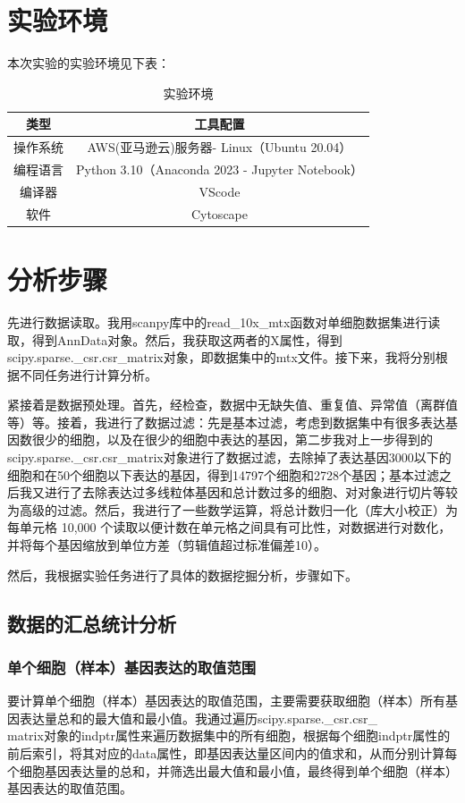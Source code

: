 \documentclass {article}
\begin{document}
%				
\section{实验环境}
本次实验的实验环境见下表：
	\begin{table}[H]
		\caption{实验环境}
		\centering
		\begin{tabular}{cc}
			\hline
			类型 & 工具配置 \\ \hline
			操作系统 & AWS(亚马逊云)服务器- Linux（Ubuntu 20.04）  \\
			编程语言 & Python 3.10（Anaconda 2023 - Jupyter Notebook） \\ 
			编译器  & VScode                                      \\ 
			软件   & Cytoscape                                     \\ \hline
		\end{tabular}
	\end{table}
		
\section{分析步骤}
	先进行数据读取。我用scanpy库中的read\_10x\_mtx函数对单细胞数据集进行读取，得到AnnData对象。然后，我获取这两者的X属性，得到scipy.sparse.\_csr.csr\_matrix对象，即数据集中的mtx文件。接下来，我将分别根据不同任务进行计算分析。
	
	紧接着是数据预处理。首先，经检查，数据中无缺失值、重复值、异常值（离群值等）等。接着，我进行了数据过滤：先是基本过滤，考虑到数据集中有很多表达基因数很少的细胞，以及在很少的细胞中表达的基因，第二步我对上一步得到的scipy.sparse.\_csr.csr\_matrix对象进行了数据过滤，去除掉了表达基因3000以下的细胞和在50个细胞以下表达的基因，得到14797个细胞和2728个基因；基本过滤之后我又进行了去除表达过多线粒体基因和总计数过多的细胞、对对象进行切片等较为高级的过滤。然后，我进行了一些数学运算，将总计数归一化（库大小校正）为每单元格 10,000 个读取以便计数在单元格之间具有可比性，对数据进行对数化，并将每个基因缩放到单位方差（剪辑值超过标准偏差10）。
	
	然后，我根据实验任务进行了具体的数据挖掘分析，步骤如下。
	
	\subsection{数据的汇总统计分析}
		\subsubsection{单个细胞（样本）基因表达的取值范围}
			要计算单个细胞（样本）基因表达的取值范围，主要需要获取细胞（样本）所有基因表达量总和的最大值和最小值。我通过遍历scipy.sparse.\_csr.csr\_ \\ matrix对象的indptr属性来遍历数据集中的所有细胞，根据每个细胞indptr属性的前后索引，将其对应的data属性，即基因表达量区间内的值求和，从而分别计算每个细胞基因表达量的总和，并筛选出最大值和最小值，最终得到单个细胞（样本）基因表达的取值范围。
		
\end{document}
